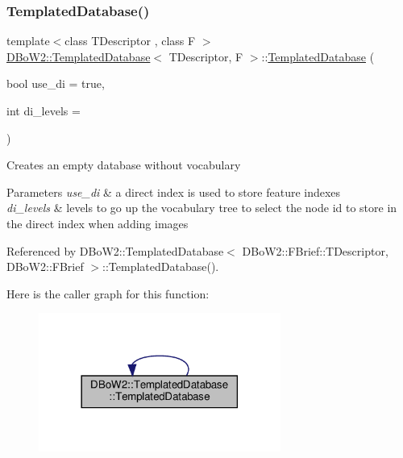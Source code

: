 \subsubsection{\texorpdfstring{Templated\+Database()}{TemplatedDatabase()}\hspace{0.1cm}{\footnotesize\ttfamily [1/5]}}
{\footnotesize\ttfamily template$<$class T\+Descriptor , class F $>$ \\
\hyperlink{classDBoW2_1_1TemplatedDatabase}{D\+Bo\+W2\+::\+Templated\+Database}$<$ T\+Descriptor, F $>$\+::\hyperlink{classDBoW2_1_1TemplatedDatabase}{Templated\+Database} (\begin{DoxyParamCaption}\item[{bool}]{use\+\_\+di = {\ttfamily true},  }\item[{int}]{di\+\_\+levels = {} }\end{DoxyParamCaption})\hspace{0.3cm}{\ttfamily [explicit]}}

Creates an empty database without vocabulary 
\begin{DoxyParams}{Parameters}
{\em use\+\_\+di} & a direct index is used to store feature indexes \\
\hline
{\em di\+\_\+levels} & levels to go up the vocabulary tree to select the node id to store in the direct index when adding images \\
\hline
\end{DoxyParams}


Referenced by D\+Bo\+W2\+::\+Templated\+Database$<$ D\+Bo\+W2\+::\+F\+Brief\+::\+T\+Descriptor, D\+Bo\+W2\+::\+F\+Brief $>$\+::\+Templated\+Database().

Here is the caller graph for this function\+:\nopagebreak
\begin{figure}[H]
\begin{center}
\leavevmode
\includegraphics[width=225pt]{classDBoW2_1_1TemplatedDatabase_a1353c2b87638fc27696fcc87b09d65cb_icgraph}
\end{center}
\end{figure}
\mbox{\label{classDBoW2_1_1TemplatedDatabase_a00022acf352915aa913488fb56fb3506}} 
